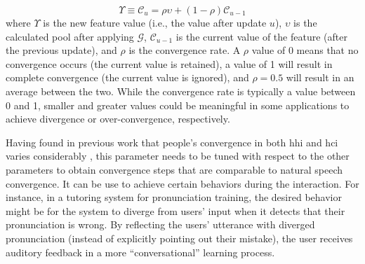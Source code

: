 \begin{equation}
\Upsilon \equiv \mathcal{C}_u = \rho \upsilon + \left(1 - \rho \right) \mathcal{C}_{u-1} 
\label{eq:convergence_rate}
\end{equation}
\noindent
where $\Upsilon$ is the new feature value (i.e., the value after update $u$), $\upsilon$ is the calculated pool after applying $\mathcal{G}$, $\mathcal{C}_{u-1}$ is the current value of the feature (after the previous update), and $\rho$ is the convergence rate.
A $\rho$ value of 0 means that no convergence occurs (the current value is retained), a value of 1 will result in complete convergence (the current value is ignored), and $\rho=0.5$ will result in an average between the two.
While the convergence rate is typically a value between 0 and 1, smaller and greater values could be meaningful in some applications to achieve divergence or over-convergence, respectively.

Having found in previous work that people's convergence in both \ac{hhi} and \ac{hci} varies considerably \citep{Gessinger2017Interspeech}, this parameter needs to be tuned with respect to the other parameters to obtain convergence steps that are comparable to natural speech convergence.
It can be use to achieve certain behaviors during the interaction.
For instance, in a tutoring system for pronunciation training, the desired behavior might be for the system to diverge from users' input when it detects that their pronunciation is wrong.
By reflecting the users' utterance with diverged pronunciation (instead of explicitly pointing out their mistake), the user receives auditory feedback in a more \enquote{conversational} learning process.

%

